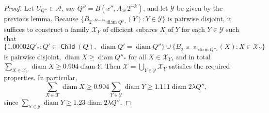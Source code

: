 \documentclass[12pt]{amsart}
\numberwithin{equation}{section}
\theoremstyle{plain}
\theoremstyle{definition}
\newcommand{\diam}{\mathop\mathrm{diam}\nolimits}
\newcommand{\Child}{\mathop\mathsf{Child}\nolimits}
\numberwithin{figure}{section}
\begin{document}
\begin{proof} Let $U_{Q''}\in\mathcal{A}$, say $Q''=B(x'',A_\mathscr{H}2^{-k})$, and let $\mathcal{Y}$ be given by the \hyperref[A-geometry]{previous lemma}. Because $\{B_{2^{-M-35}\diam Q''_*}(Y):Y\in\mathcal{Y}\}$ is pairwise disjoint, it suffices to construct a family $\mathcal{X}_Y$ of efficient subarcs $X$ of $Y$ for each $Y\in\mathcal{Y}$ such that $$\{1.00002Q'_*:Q'\in\Child(Q),\;\diam Q'=\diam Q''\}\cup\{B_{2^{-M-35}\diam Q''_*}(X):X\in\mathcal{X}_Y\}$$ is pairwise disjoint, $\diam X\geq \diam Q''_*$ for all $X\in\mathcal{X}_Y$, and in total $\sum_{X\in\mathcal{X}_Y}\diam X\geq 0.904\diam Y$. Then $\mathcal{X}=\bigcup_{Y\in\mathcal{Y}}\mathcal{X}_Y$ satisfies the required properties. In particular, $$\sum_{X\in\mathcal{X}}\diam X\geq 0.904\sum_{Y\in\mathcal{Y}}\diam Y \geq 1.111 \diam 2\lambda Q'',$$ since $\sum_{Y\in\mathcal{Y}}\diam Y\geq 1.23\diam 2\lambda Q''$.


\end{proof}
\end{document}
